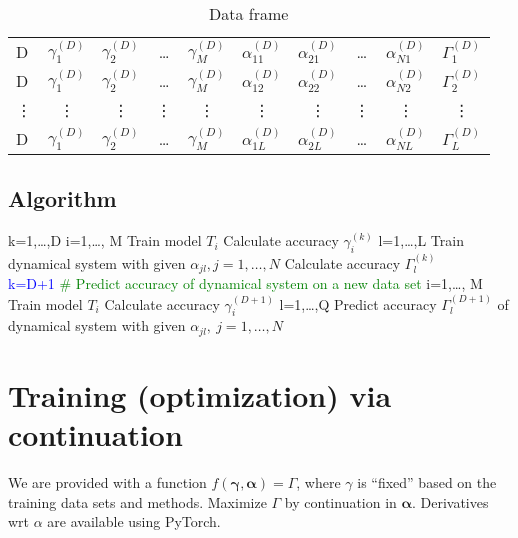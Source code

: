 \documentclass{article}
\newcommand{\tblue}[1]{\textcolor{Blue}{#1}}
\newcommand{\tgreen}[1]{\textcolor{Green}{#1}}
\begin{document}
\begin{table}[H]
\begin{tabular}{||l||c|c|c|c||c|c|c|c|c||}
\hline
D        & $\gamma_1^{(D)}$ & $\gamma_2^{(D)}$ & \dots    & $\gamma_M^{(D)}$ & $\alpha_{11}^{(D)}$ & $\alpha_{21}^{(D)}$ & \dots  & $\alpha_{N1}^{(D)}$  & $\Gamma_1^{(D)}$ \\
D        & $\gamma_1^{(D)}$ & $\gamma_2^{(D)}$ & \dots    & $\gamma_M^{(D)}$ & $\alpha_{12}^{(D)}$ & $\alpha_{22}^{(D)}$ & \dots  & $\alpha_{N2}^{(D)}$  & $\Gamma_2^{(D)}$ \\
\vdots   & \vdots           & \vdots           & \vdots   & \vdots           & \vdots              & \vdots              & \vdots & \vdots               & \vdots         \\
D        & $\gamma_1^{(D)}$ & $\gamma_2^{(D)}$ & \dots    & $\gamma_M^{(D)}$ & $\alpha_{1L}^{(D)}$ & $\alpha_{2L}^{(D)}$ & \dots  & $\alpha_{NL}^{(D)}$  & $\Gamma_L^{(D)}$ \\
\hline
\end{tabular}
\caption{Data frame}
\label{first table}
\end{table}

\subsection{Algorithm}

\begin{algorithmic}
\For k=1,\dots,D
    \For i=1,\dots, M
      \State Train model $T_i$
     \State Calculate accuracy $\gamma_i^{(k)}$
    \EndFor
    \For l=1,\dots,L
       \State Train dynamical system with given $\alpha_{jl}, j=1,\dots,N$
       \State Calculate accuracy $\Gamma_l^{(k)}$
    \EndFor
\EndFor
\\
\State \tblue{k=D+1} \; \tgreen{\# Predict accuracy of dynamical system on a new data set}
\For i=1,\dots, M
   \State Train model $T_i$
   \State Calculate accuracy $\gamma_i^{(D+1)}$
\EndFor
\For l=1,\dots,Q
   \State Predict accuracy $\Gamma_l^{(D+1)}$ of dynamical system with given $\alpha_{jl}, \ j=1,\dots,N$
\EndFor
\end{algorithmic}

\section{Training (optimization) via continuation}

We are provided with a function $f( \boldsymbol{\gamma}, \boldsymbol{\alpha}) = \Gamma$, where $\gamma$ is ``fixed'' based on the training data sets and methods.  Maximize $\Gamma$ by continuation in $\boldsymbol{\alpha}$. Derivatives wrt $\alpha$ are available using PyTorch.
\end{document}
